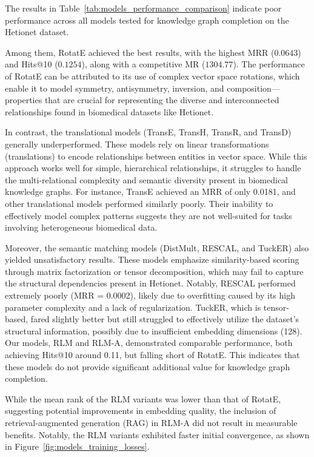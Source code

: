 The results in Table~\ref{tab:models_performance_comparison} indicate poor performance across all models tested for knowledge graph completion on the Hetionet dataset.

Among them, RotatE achieved the best results, with the highest MRR ($0.0643$) and Hits@10 ($0.1254$), along with a competitive MR ($1304.77$). The performance of RotatE can be attributed to its use of complex vector space rotations, which enable it to model symmetry, antisymmetry, inversion, and composition—properties that are crucial for representing the diverse and interconnected relationships found in biomedical datasets like Hetionet.

In contrast, the translational models (TransE, TransH, TransR, and TransD) generally underperformed. These models rely on linear transformations (translations) to encode relationships between entities in vector space. While this approach works well for simple, hierarchical relationships, it struggles to handle the multi-relational complexity and semantic diversity present in biomedical knowledge graphs. For instance, TransE achieved an MRR of only 0.0181, and other translational models performed similarly poorly. Their inability to effectively model complex patterns suggests they are not well-suited for tasks involving heterogeneous biomedical data.

Moreover, the semantic matching models (DistMult, RESCAL, and TuckER) also yielded unsatisfactory results. These models emphasize similarity-based scoring through matrix factorization or tensor decomposition, which may fail to capture the structural dependencies present in Hetionet. Notably, RESCAL performed extremely poorly (MRR = 0.0002), likely due to overfitting caused by its high parameter complexity and a lack of regularization. TuckER, which is tensor-based, fared slightly better but still struggled to effectively utilize the dataset’s structural information, possibly due to insufficient embedding dimensions (128).
Our models, RLM and RLM-A, demonstrated comparable performance, both achieving Hits@10 around 0.11, but falling short of RotatE. This indicates that these models do not provide significant additional value for knowledge graph completion.

While the mean rank of the RLM variants was lower than that of RotatE, suggesting potential improvements in embedding quality, the inclusion of retrieval-augmented generation (RAG) in RLM-A did not result in measurable benefits.
Notably, the RLM variants exhibited faster initial convergence, as shown in Figure~\ref{fig:models_training_losses}.

